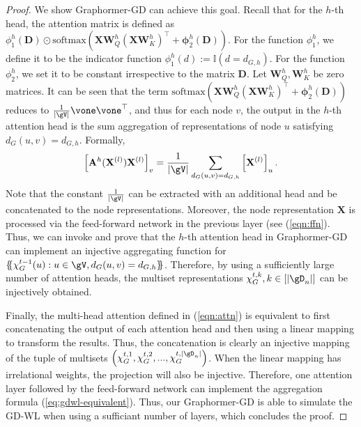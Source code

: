 \documentclass{article} %
\let\cref\crtcref
\newcommand*{\ldblbrace}{\{\mskip-5mu\{}
\newcommand*{\rdblbrace}{\}\mskip-5mu\}}
\begin{document}
\begin{proof}
We show Graphormer-GD can achieve this goal. Recall that for the $h$-th head, the attention matrix is defined as $\phi_1^{h}(\mathbf D)\odot\mathrm{softmax}\left(\mathbf X \mathbf W_Q^{h}(\mathbf X \mathbf W_K^{h})^{\top}+\mathbf \phi_2^{h}(\mathbf D)\right)$. For the function $\phi_1^{h}$, we define it to be the indicator function $\phi_1^{h}(d):=\mathbb I(d=d_{G,h})$. For the function $\phi_2^{h}$, we set it to be constant irrespective to the matrix $\mathbf D$. Let $\mathbf W_Q^{h},\mathbf W_K^{h}$ be zero matrices. It can be seen that the term $\mathrm{softmax}\left(\mathbf X \mathbf W_Q^{h}(\mathbf X \mathbf W_K^{h})^{\top}+\mathbf \phi_2^{h}(\mathbf D)\right)$ reduces to $\frac{1}{|\gV|}\vone \vone^{\top}$, and thus for each node $v$, the output in the $h$-th attention head is the sum aggregation of representations of node $u$ satisfying $d_G(u,v)=d_{G,h}$. Formally, 
\begin{equation*}
    \left[\mathbf A^h(\mathbf X^{(l)})\mathbf X^{(l)}\right]_{v}=\frac 1 {|\gV|}\sum_{d_G(u,v)=d_{G,h}} \left[\mathbf X^{(l)}\right]_u.
\end{equation*}
Note that the constant $\frac{1}{|\gV|}$ can be extracted with an additional head and be concatenated to the node representations. Moreover, the node representation $\mathbf X$ is processed via the feed-forward network in the previous layer (see (\ref{eqn:ffn}). Thus, we can invoke \cref{thm:lemma-injective-multiset} and prove that the $h$-th attention head in Graphormer-GD can implement an injective aggregating function for $\ldblbrace \chi_G^{t-1}(u):u\in \gV, {d_G(u,v)=d_{G,h}} \rdblbrace$. Therefore, by using a sufficiently large number of attention heads, the multiset representations $\chi_G^{t,k},k\in[|\gD_n|]$ can be injectively obtained.

Finally, the multi-head attention defined in (\ref{eqn:attn}) is equivalent to first concatenating the output of each attention head and then using a linear mapping to transform the results. Thus, the concatenation is clearly an injective mapping of the tuple of multisets $\left(\chi_G^{t,1},\chi_G^{t,2},...,\chi_G^{t,|\gD_n|}\right)$. When the linear mapping has irrelational weights, the projection will also be injective. Therefore, one attention layer followed by the feed-forward network can implement the aggregation formula (\ref{eq:gdwl-equivalent}). Thus, our Graphormer-GD is able to simulate the GD-WL when using a sufficiant number of layers, which concludes the proof.
\end{proof}
\end{document}
